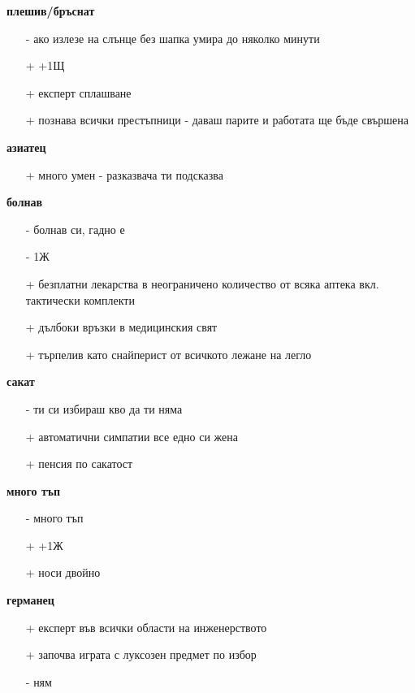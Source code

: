 \documentclass{article}
\begin{document}
\textbf{плешив/бръснат}
\begin{itemize}
\item[-] ако излезе на слънце без шапка умира до няколко минути
\item[+] +1Щ
\item[+] експерт сплашване
\item[+] познава всички престъпници - даваш парите и работата ще бъде свършена  \\
\end{itemize}

\textbf{азиатец}
\begin{itemize}
\item[+] много умен - разказвача ти подсказва  \\
\end{itemize}

\textbf{болнав}
\begin{itemize}
\item[-] болнав си, гадно е
\item[-] 1Ж
\item[+] безплатни лекарства в неограничено количество от всяка аптека вкл. тактически комплекти
\item[+] дълбоки връзки в медицинския свят
\item[+] търпелив като снайперист от всичкото лежане на легло  \\
\end{itemize}

\textbf{сакат}
\begin{itemize}
\item[-] ти си избираш кво да ти няма
\item[+] автоматични симпатии все едно си жена
\item[+] пенсия по сакатост  \\
\end{itemize}

\textbf{много тъп}
\begin{itemize}
\item[-] много тъп
\item[+] +1Ж
\item[+] носи двойно  \\
\end{itemize}

\textbf{германец}
\begin{itemize}
\item[+] експерт във всички области на инженерството
\item[+] започва играта с луксозен предмет по избор
\item[-] ням  \\
\end{itemize}
\end{document}
